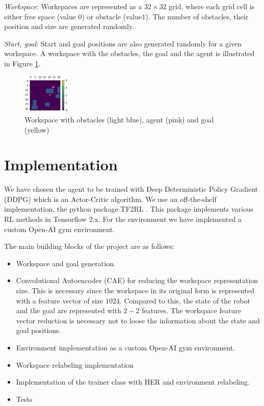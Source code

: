 \documentclass[conference]{IEEEtran}
\begin{document}
\textit{Workspace}: Workspaces are represented as a $32 \times 32$ grid, where each grid cell is either free space (value $0$) or obstacle (value$1$). The number of obstacles, their position and size are generated randomly. 

\textit{Start, goal}: Start and goal positions are also generated randomly for a given workspace. A workspace with the obstacles, the goal and the agent is illustrated in Figure \ref{fig:1}.

\begin{figure}[h!]
	\centering
	\includegraphics[width=0.2\textwidth]{fig/workspace.jpg}
	\caption{Workspace with obstacles (light blue), agent (pink) and goal (yellow)}
	\label{fig:1}
\end{figure}

\section{Implementation}

We have chosen the agent to be trained with Deep Deterministic Policy Gradient (DDPG) \cite{DDPG} which is an Actor-Critic algorithm. We use an off-the-shelf implementation, the python package TF2RL \cite{TF2RL}. This package implements various RL methods in Tensorflow 2.x. For the environment we have implemented a custom Open-AI gym environment.

The main building blocks of the project are as follows:
\begin{itemize}
	\item Workspace and goal generation.
	\item Convolutional Autoencoder (CAE) for reducing the workspace representation size. This is necessary since the workspace in its original form is represented with a feature vector of size $1024$. Compared to this, the state of the robot and the goal are represented with $2-2$ features. The workspace feature vector reduction is necessary not to loose the information about the state and goal positions.
	\item Environment implementation as a custom Open-AI gym environment.
	\item Workspace relabeling implementation
	\item Implementation of the trainer class with HER and environment relabeling.
	\item Tests
\end{itemize}
\end{document}
